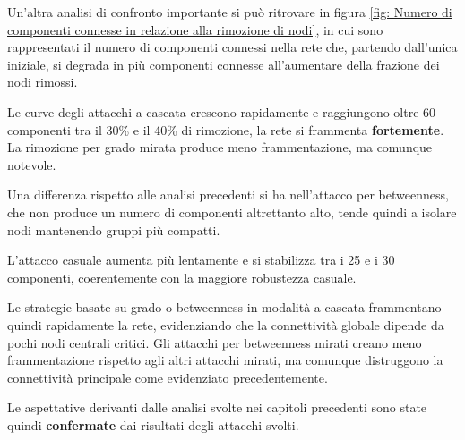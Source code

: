 Un'altra analisi di confronto importante si può ritrovare in figura \ref{fig: Numero di componenti connesse in relazione alla rimozione di nodi}, in cui sono rappresentati il numero di componenti connessi nella rete che, partendo dall'unica iniziale, si degrada in più componenti connesse all'aumentare della frazione dei nodi rimossi.

Le curve degli attacchi a cascata crescono rapidamente e raggiungono oltre 60 componenti tra il 30\% e il 40\% di rimozione, la rete si frammenta \textbf{fortemente}.
La rimozione per grado mirata produce meno frammentazione, ma comunque notevole.

Una differenza rispetto alle analisi precedenti si ha nell'attacco per betweenness, che non produce un numero di componenti altrettanto alto, tende quindi a isolare nodi mantenendo gruppi più compatti.

L'attacco casuale aumenta più lentamente e si stabilizza tra i 25 e i 30 componenti, coerentemente con la maggiore robustezza casuale.

Le strategie basate su grado o betweenness in modalità a cascata frammentano quindi rapidamente la rete, evidenziando che la connettività globale dipende da pochi nodi centrali critici. Gli attacchi per betweenness mirati creano meno frammentazione rispetto agli altri attacchi mirati, ma comunque distruggono la connettività principale come evidenziato precedentemente.

Le aspettative derivanti dalle analisi svolte nei capitoli precedenti sono state quindi \textbf{confermate} dai risultati degli attacchi svolti.